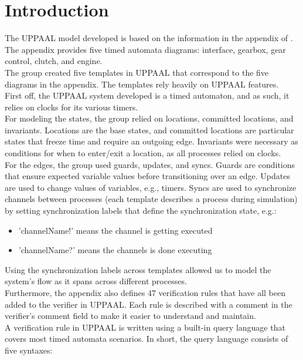 \section{Introduction}

The UPPAAL model developed is based on the information in the appendix of \cite{gearcontrol}. The appendix provides five timed automata diagrams: interface, gearbox, gear control, clutch, and engine. \\
The group created five templates in UPPAAL that correspond to the five diagrams in the appendix. The templates rely heavily on UPPAAL features. \\
First off, the UPPAAL system developed is a timed automaton, and as such, it relies on clocks for its various timers. \\
For modeling the states, the group relied on locations, committed locations, and invariants. Locations are the base states, and committed locations are particular states that freeze time and require an outgoing edge. Invariants were necessary as conditions for when to enter/exit a location, as all processes relied on clocks. \\
For the edges, the group used guards, updates, and syncs. Guards are conditions that ensure expected variable values before transitioning over an edge. Updates are used to change values of variables, e.g., timers. Syncs are used to synchronize channels between processes (each template describes a process during simulation) by setting synchronization labels that define the synchronization state, e.g.:

\begin{itemize}
    \item 'channelName!' means the channel is getting executed
    \item 'channelName?' means the channels is done executing
\end{itemize}

Using the synchronization labels across templates allowed us to model the system's flow as it spans across different processes. \\

Furthermore, the appendix also defines 47 verification rules that have all been added to the verifier in UPPAAL. Each rule is described with a comment in the verifier's comment field to make it easier to understand and maintain. \\ 
A verification rule in UPPAAL is written using a built-in query language that covers most timed automata scenarios. In short, the query language consists of five syntaxes:

